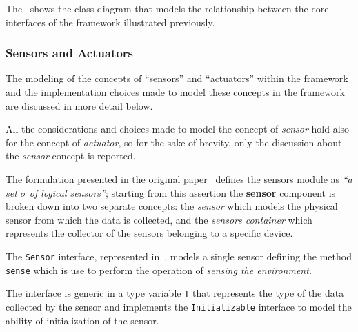 The~ shows the class diagram that models the relationship between the core interfaces of the framework
illustrated previously.

\subsubsection{Sensors and Actuators}

The modeling of the concepts of ``sensors'' and ``actuators'' within the framework and the implementation choices made to model these concepts in the
framework are discussed in more detail below.

All the considerations and choices made to model the concept of \emph{sensor} hold also for the concept of \emph{actuator}, so for the sake of
brevity, only the discussion about the \emph{sensor} concept is reported.

The formulation presented in the original paper~\cite{fi12110203} defines the sensors module as \textit{``a set $\sigma$ of logical sensors''};
starting from this assertion the \textbf{sensor} component is broken down into two separate concepts: the \emph{sensor} which models the physical
sensor from which the data is collected, and the \emph{sensors container} which represents the collector of the sensors belonging to a specific
device.

The \texttt{Sensor} interface, represented in~, models a single sensor defining the method \texttt{sense} which is use to
perform the operation of \emph{sensing the environment.}



The interface is generic in a type variable \texttt{T} that represents the type of the data collected by the sensor and implements the
\texttt{Initializable} interface to model the ability of initialization of the sensor.



